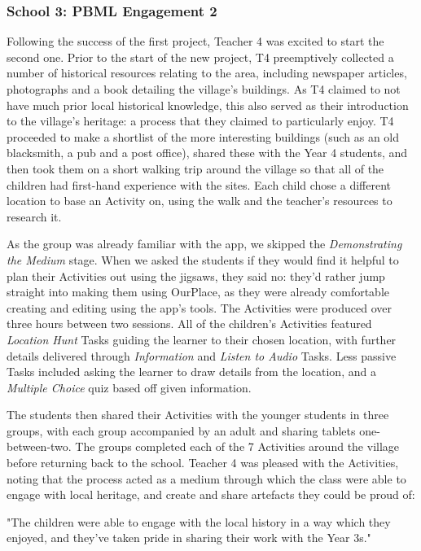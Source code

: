 \subsubsection{School 3: PBML Engagement 2}

Following the success of the first project, Teacher 4 was excited to start the second one. Prior to the start of the new project, T4 preemptively collected a number of historical resources relating to the area, including newspaper articles, photographs and a book detailing the village's buildings. As T4 claimed to not have much prior local historical knowledge, this also served as their introduction to the village's heritage: a process that they claimed to particularly enjoy. T4 proceeded to make a shortlist of the more interesting buildings (such as an old blacksmith, a pub and a post office), shared these with the Year 4 students, and then took them on a short walking trip around the village so that all of the children had first-hand experience with the sites. Each child chose a different location to base an Activity on, using the walk and the teacher's resources to research it.

As the group was already familiar with the app, we skipped the \textit{Demonstrating the Medium} stage. When we asked the students if they would find it helpful to plan their Activities out using the jigsaws, they said no: they'd rather jump straight into making them using OurPlace, as they were already comfortable creating and editing using the app's tools. The Activities were produced over three hours between two sessions. All of the children's Activities featured \textit{Location Hunt} Tasks guiding the learner to their chosen location, with further details delivered through \textit{Information} and \textit{Listen to Audio} Tasks. Less passive Tasks included asking the learner to draw details from the location, and a \textit{Multiple Choice} quiz based off given information. 

The students then shared their Activities with the younger students in three groups, with each group accompanied by an adult and sharing tablets one-between-two. The groups completed each of the 7 Activities around the village before returning back to the school. Teacher 4 was pleased with the Activities, noting that the process acted as a medium through which the class were able to engage with local heritage, and create and share artefacts they could be proud of:

\begin{displayquote}
"The children were able to engage with the local history in a way which they enjoyed, and they've taken pride in sharing their work with the Year 3s."
\end{displayquote}


